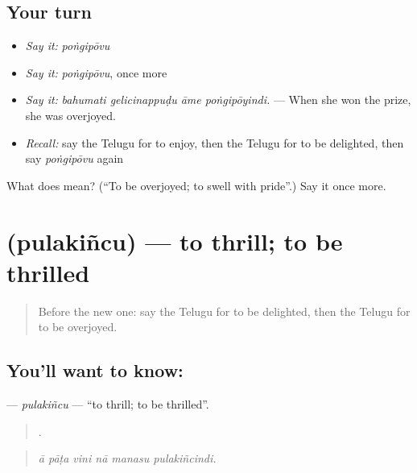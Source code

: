 \subsection*{Your turn}
\begin{itemize}
\raggedright
  \item \emph{Say it:} \emph{poṅgipōvu}
  \item \emph{Say it:} \emph{poṅgipōvu}, once more
  \item \emph{Say it:} \emph{bahumati gelicinappuḍu āme poṅgipōyindi.} — When she won the prize, she was overjoyed.
  \item \emph{Recall:} say the Telugu for to enjoy, then the Telugu for to be delighted, then say \emph{poṅgipōvu} again
\end{itemize}

\begin{tcolorbox}[breakable,colback=teal!4,colframe=teal!35!black,title={Before you move on}]
What does  mean? (\textquotedblleft{}To be overjoyed; to swell with pride\textquotedblright{}.) Say it once more.
\end{tcolorbox}
\section[\texorpdfstring{\te{పులకించు} (pulakiñcu)}{పులకించు (pulakiñcu)}]{ (pulakiñcu) — to thrill; to be thrilled}

\label{lesson:TE-C500-pulakincu}



\begin{quote}
Before the new one: say the Telugu for to be delighted, then the Telugu for to be overjoyed.
\end{quote}

\subsection*{You'll want to know: }
\textbf{} — \emph{pulakiñcu} — \textquotedblleft{}to thrill; to be thrilled\textquotedblright{}.

\begin{quote}
     .
\end{quote}

\begin{quote}
\emph{ā pāṭa vini nā manasu pulakiñcindi.}
\end{quote}

